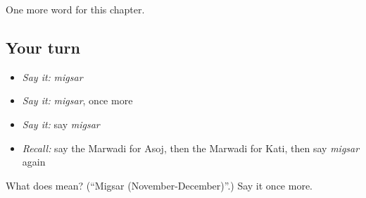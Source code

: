 \begin{grammarlens}[title={What you've built}]
One more word for this chapter.
\end{grammarlens}

\subsection*{Your turn}
\begin{itemize}
\raggedright
  \item \emph{Say it:} \emph{migsar}
  \item \emph{Say it:} \emph{migsar}, once more
  \item \emph{Say it:} say \emph{migsar}
  \item \emph{Recall:} say the Marwadi for Asoj, then the Marwadi for Kati, then say \emph{migsar} again
\end{itemize}

\begin{tcolorbox}[breakable,colback=teal!4,colframe=teal!35!black,title={Before you move on}]
What does  mean? (\textquotedblleft{}Migsar (November-December)\textquotedblright{}.) Say it once more.
\end{tcolorbox}
